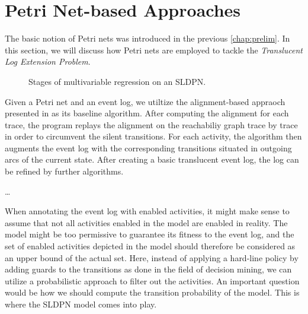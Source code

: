 \section{Petri Net-based Approaches} \label{sec:petri_net_approaches}

The basic notion of Petri nets was introduced in the previous \cref{chap:prelim}. In this section, we will discuss how Petri nets are employed to tackle the \emph{Translucent Log Extension Problem}.

\begin{figure}
    \centering
    \caption{Stages of multivariable regression on an SLDPN.}
    \label{sldpn-multivar-regression}
\end{figure}

Given a Petri net and an event log, we utiltize the alignment-based appraoch presented in \cite{creating-translucent-event-logs} as its baseline algorithm. After computing the alignment for each trace, the program replays the alignment on the reachabiliy graph trace by trace in order to circumvent the silent transitions. For each activity, the algorithm then augments the event log with the corresponding transitions situated in outgoing arcs of the current state. After creating a basic translucent event log, the log can be refined by further algorithms.

\dots

When annotating the event log with enabled activities, it might make sense to assume that not all activities enabled in the model are enabled in reality. The model might be too permissive to guarantee its fitness to the event log, and the set of enabled activities depicted in the model should therefore be considered as an upper bound of the actual set. Here, instead of applying a hard-line policy by adding guards to the transitions as done in the field of decision mining, we can utilize a probabilistic approach to filter out the activities. An important question would be how we should compute the transition probability of the model. This is where the SLDPN model comes into play.


